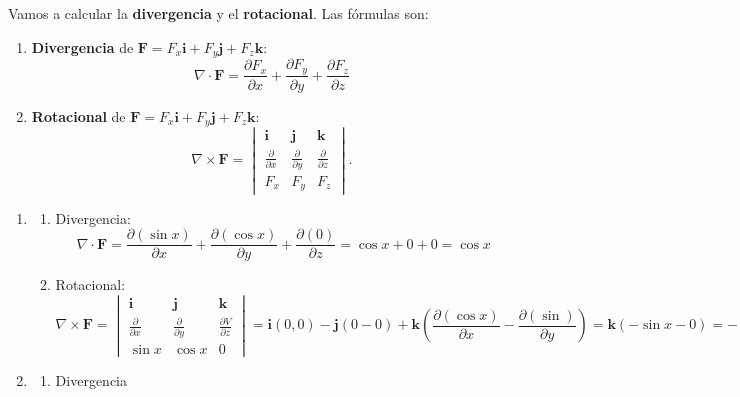 \begin{enumerate}[label=\color{red}\textbf{\arabic*)}]
    Vamos a calcular la \textbf{divergencia} y el \textbf{rotacional}. Las fórmulas son: 
\begin{enumerate}[label=\arabic*)]
  \item \textbf{Divergencia} de $\mathbf{F}=F_x\mathbf{i} +F_y\mathbf{j} +F_z\mathbf{k}:$ 
    \[
    \nabla \cdot \mathbf{F} =\frac{\partial F_x}{\partial x} +\frac{\partial F_y}{\partial y} +\frac{\partial F_z}{\partial z} 
    \] 
  \item \textbf{Rotacional} de $\mathbf{F} =F_x\mathbf{i} +F_y\mathbf{j} +F_z\mathbf{k} $:
    \[
    \nabla \times \mathbf{F} =\begin{vmatrix} 
      \mathbf{i}  & \mathbf{j} & \mathbf{k} \\
      \frac{\partial }{\partial x} & \frac{\partial }{\partial y} & \frac{\partial }{\partial z} \\
      F_x & F_y & F_z
    \end{vmatrix}. 
    \] 
\end{enumerate}
    \begin{enumerate}[label=\color{red}\textbf{\alph*)}]
      \item {} 
        \begin{enumerate}[label=\arabic*)]
          \item Divergencia:
            \[
              \nabla \cdot \mathbf{F} =\frac{\partial (\sin x)}{\partial x} +\frac{\partial (\cos x)}{\partial y} +\frac{\partial (0)}{\partial z} = \cos x+0+0=\cos x
            \] 
          \item Rotacional:
            \[
            \nabla \times \mathbf{F} = \begin{vmatrix} 
              \mathbf{i}  & \mathbf{j} & \mathbf{k} \\
              \frac{\partial }{\partial x} & \frac{\partial }{\partial y} & \frac{\partial V}{\partial z} \\
              \sin x & \cos x & 0
            \end{vmatrix} =\mathbf{i} (0,0)-\mathbf{j} (0-0)+\mathbf{k} \left( \frac{\partial (\cos x)}{\partial x} -\frac{\partial (\sin )}{\partial y}  \right) =\mathbf{k} (-\sin x-0)=-\sin x\mathbf{k} 
            \] 
        \end{enumerate}
      \item {} 
        \begin{enumerate}[label=\arabic*)]
          \item Divergencia

\end{enumerate}
\end{enumerate}
\end{enumerate}
